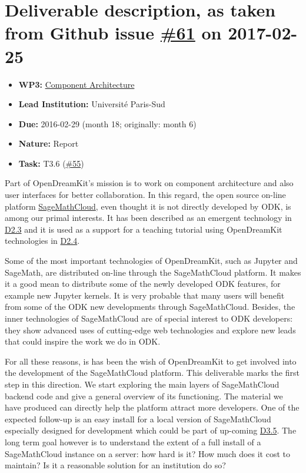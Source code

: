 \section*{\texorpdfstring{Deliverable description, as taken from Github
issue
\href{https://github.com/OpenDreamKit/OpenDreamKit/issues/61}{\#61} on
2017-02-25}{Deliverable description, as taken from Github issue \#61 on 2017-02-25}}\label{deliverable-description-as-taken-from-github-issue-61-on-2017-02-25}

\begin{itemize}
\tightlist
\item
  \textbf{WP3:}
  \href{https://github.com/OpenDreamKit/OpenDreamKit/tree/master/WP3}{Component
  Architecture}
\item
  \textbf{Lead Institution:} Université Paris-Sud
\item
  \textbf{Due:} 2016-02-29 (month 18; originally: month 6)
\item
  \textbf{Nature:} Report
\item
  \textbf{Task:} T3.6
  (\href{https://github.com/OpenDreamKit/OpenDreamKit/issues/55}{\#55})
\end{itemize}

Part of OpenDreamKit's mission is to work on component architecture and
also user interfaces for better collaboration. In this regard, the open
source on-line platform
\href{http://cloud.sagemath.com/}{SageMathCloud}, even thought it is not
directly developed by ODK, is among our primal interests. It has been
described as an emergent technology in
\href{https://github.com/OpenDreamKit/OpenDreamKit/issues/43}{D2.3} and
it is used as a support for a teaching tutorial using OpenDreamKit
technologies in
\href{https://github.com/OpenDreamKit/OpenDreamKit/issues/44}{D2.4}.

Some of the most important technologies of OpenDreamKit, such as Jupyter
and SageMath, are distributed on-line through the SageMathCloud
platform. It makes it a good mean to distribute some of the newly
developed ODK features, for example new Jupyter kernels. It is very
probable that many users will benefit from some of the ODK new
developments through SageMathCloud. Besides, the inner technologies of
SageMathCloud are of special interest to ODK developers: they show
advanced uses of cutting-edge web technologies and explore new leads
that could inspire the work we do in ODK.

For all these reasons, is has been the wish of OpenDreamKit to get
involved into the development of the SageMathCloud platform. This
deliverable marks the first step in this direction. We start exploring
the main layers of SageMathCloud backend code and give a general
overview of its functioning. The material we have produced can directly
help the platform attract more developers. One of the expected follow-up
is an easy install for a local version of SageMathCloud especially
designed for development which could be part of up-coming
\href{https://github.com/OpenDreamKit/OpenDreamKit/issues/63}{D3.5}. The
long term goal however is to understand the extent of a full install of
a SageMathCloud instance on a server: how hard is it? How much does it
cost to maintain? Is it a reasonable solution for an institution do so?
